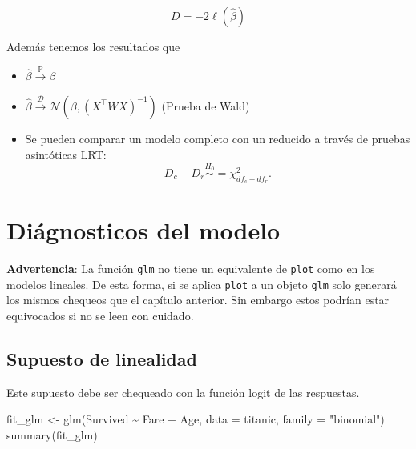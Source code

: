 \documentclass[
  12pt,
]{book}
\newenvironment{Shaded}{\begin{snugshade}}{\end{snugshade}}
\newcommand{\AttributeTok}[1]{\textcolor[rgb]{0.77,0.63,0.00}{#1}}
\newcommand{\FunctionTok}[1]{\textcolor[rgb]{0.00,0.00,0.00}{#1}}
\newcommand{\NormalTok}[1]{#1}
\newcommand{\OtherTok}[1]{\textcolor[rgb]{0.56,0.35,0.01}{#1}}
\newcommand{\SpecialCharTok}[1]{\textcolor[rgb]{0.00,0.00,0.00}{#1}}
\newcommand{\StringTok}[1]{\textcolor[rgb]{0.31,0.60,0.02}{#1}}
\providecommand{\tightlist}{%
  \setlength{\itemsep}{0pt}\setlength{\parskip}{0pt}}
\theoremstyle{definition}
\theoremstyle{definition}
\theoremstyle{definition}
\theoremstyle{definition}
\theoremstyle{remark}
\begin{document}
\begin{equation*}
D = -2 \ell(\hat{\beta})
\end{equation*}

Además tenemos los resultados que

\begin{itemize}
\tightlist
\item
  \(\hat{\beta} \xrightarrow{\mathbb{P}} \beta\)
\item
  \(\hat{\beta} \xrightarrow{\mathcal{D}} \mathcal{N}\left(\beta,(X^{\top}WX)^{-1}\right)\) (Prueba de Wald)
\item
  Se pueden comparar un modelo completo con un reducido a través de pruebas asintóticas LRT:
  \begin{equation*}
  D_c -D_r \stackrel{H_0}{\sim} =\chi^{2}_{df_{c}-df_r}.
  \end{equation*}
\end{itemize}

\hypertarget{diuxe1gnosticos-del-modelo}{%
\section{Diágnosticos del modelo}\label{diuxe1gnosticos-del-modelo}}

\textbf{Advertencia}: La función \texttt{glm} no tiene un equivalente de \texttt{plot} como en los modelos lineales. De esta forma, si se aplica \texttt{plot} a un objeto \texttt{glm} solo generará los mismos chequeos que el capítulo anterior. Sin embargo estos podrían estar equivocados si no se leen con cuidado.

\hypertarget{supuesto-de-linealidad}{%
\subsection{Supuesto de linealidad}\label{supuesto-de-linealidad}}

Este supuesto debe ser chequeado con la función logit de las respuestas.

\begin{Shaded}
\begin{Highlighting}[]
\NormalTok{fit\_glm }\OtherTok{\textless{}{-}} \FunctionTok{glm}\NormalTok{(Survived }\SpecialCharTok{\textasciitilde{}}\NormalTok{ Fare }\SpecialCharTok{+}\NormalTok{ Age, }\AttributeTok{data =}\NormalTok{ titanic,}
    \AttributeTok{family =} \StringTok{"binomial"}\NormalTok{)}
\FunctionTok{summary}\NormalTok{(fit\_glm)}
\end{Highlighting}
\end{Shaded}
\end{document}
